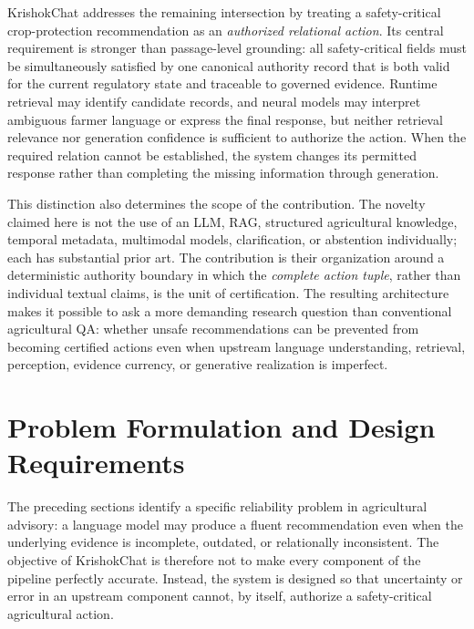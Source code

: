\documentclass[a4paper,fleqn]{cas-dc}
\begin{document}
KrishokChat addresses the remaining intersection by treating a safety-critical crop-protection recommendation as an \emph{authorized relational action}. Its central requirement is stronger than passage-level grounding: all safety-critical fields must be simultaneously satisfied by one canonical authority record that is both valid for the current regulatory state and traceable to governed evidence. Runtime retrieval may identify candidate records, and neural models may interpret ambiguous farmer language or express the final response, but neither retrieval relevance nor generation confidence is sufficient to authorize the action. When the required relation cannot be established, the system changes its permitted response rather than completing the missing information through generation.

This distinction also determines the scope of the contribution. The novelty claimed here is not the use of an LLM, RAG, structured agricultural knowledge, temporal metadata, multimodal models, clarification, or abstention individually; each has substantial prior art. The contribution is their organization around a deterministic authority boundary in which the \emph{complete action tuple}, rather than individual textual claims, is the unit of certification. The resulting architecture makes it possible to ask a more demanding research question than conventional agricultural QA: whether unsafe recommendations can be prevented from becoming certified actions even when upstream language understanding, retrieval, perception, evidence currency, or generative realization is imperfect.

\section{Problem Formulation and Design Requirements}
\label{sec:problem_formulation}

The preceding sections identify a specific reliability problem in agricultural advisory: a language model may produce a fluent recommendation even when the underlying evidence is incomplete, outdated, or relationally inconsistent. The objective of KrishokChat is therefore not to make every component of the pipeline perfectly accurate. Instead, the system is designed so that uncertainty or error in an upstream component cannot, by itself, authorize a safety-critical agricultural action.
\end{document}

